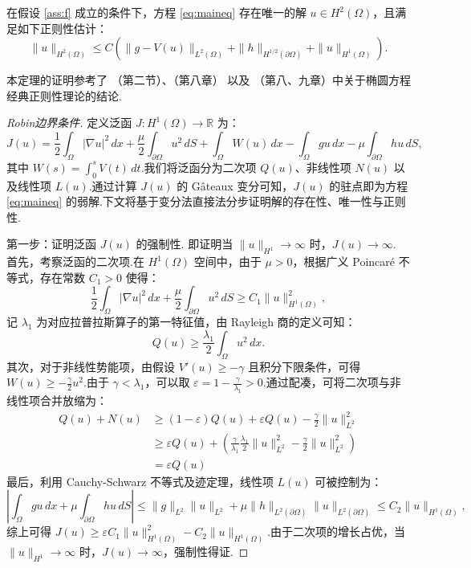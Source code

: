 \begin{theorem}[先验估计]\label{th:ch3reg}
在假设 \ref{ass:f} 成立的条件下，方程 \eqref{eq:maineq} 存在唯一的解 $u \in H^2(\Omega)$，且满足如下正则性估计：
$$\|u\|_{H^2(\Omega)} \le C \left( \|g - V(u)\|_{L^2(\Omega)} + \|h\|_{H^{1/2}(\partial \Omega)} + \|u\|_{H^1(\Omega)} \right).$$
\end{theorem}
本定理的证明参考了 \cite{roubicek2013nonlinear}（第二节）、\cite{evans2010partial}（第八章） 以及 \cite{brezis2011functional}（第八、九章）中关于椭圆方程经典正则性理论的结论.
\begin{proof}[Robin边界条件]
定义泛函 $J: H^1(\Omega) \to \mathbb{R}$ 为：
$$J(u) = \frac{1}{2}\int_{\Omega} |\nabla u|^2 \, dx + \frac{\mu}{2}\int_{\partial \Omega} u^2 \, dS + \int_{\Omega} W(u) \, dx - \int_{\Omega} gu \, dx - \mu \int_{\partial \Omega} hu \, dS,$$
其中 $W(s) = \int_0^s V(t) \, dt$.我们将泛函分为二次项 $Q(u)$、非线性项 $N(u)$ 以及线性项 $L(u)$.通过计算 $J(u)$ 的 Gâteaux 变分可知，$J(u)$ 的驻点即为方程 \eqref{eq:maineq} 的弱解.下文将基于变分法直接法分步证明解的存在性、唯一性与正则性.

第一步：证明泛函 $J(u)$ 的强制性.
即证明当 $\|u\|_{H^1} \to \infty$ 时，$J(u) \to \infty$.
首先，考察泛函的二次项.在 $H^1(\Omega)$ 空间中，由于 $\mu > 0$，根据广义 Poincaré 不等式，存在常数 $C_1 > 0$ 使得：
$$\frac{1}{2}\int_{\Omega} |\nabla u|^2 \, dx + \frac{\mu}{2}\int_{\partial \Omega} u^2 \, dS \ge C_1 \|u\|_{H^1(\Omega)}^2,$$
记 $\lambda_1$ 为对应拉普拉斯算子的第一特征值，由 Rayleigh 商的定义可知：
\begin{equation*}
Q(u) \ge \frac{\lambda_1}{2} \int_{\Omega} u^2 \, dx.
\end{equation*}
其次，对于非线性势能项，由假设 $V'(u) \ge -\gamma$ 且积分下限条件，可得 $W(u) \ge -\frac{\gamma}{2} u^2$.由于 $\gamma < \lambda_1$，可以取 $\varepsilon = 1 - \frac{\gamma}{\lambda_1} > 0$.通过配凑，可将二次项与非线性项合并放缩为：
\begin{equation*}
\begin{aligned}
Q(u) + N(u) &\ge (1-\varepsilon)Q(u) + \varepsilon Q(u) - \frac{\gamma}{2}\|u\|_{L^2}^2\\
&\ge \varepsilon Q(u) + \left( \frac{\gamma}{\lambda_1} \frac{\lambda_1}{2} \|u\|_{L^2}^2 - \frac{\gamma}{2} \|u\|_{L^2}^2 \right) \\
&= \varepsilon Q(u)
\end{aligned}
\end{equation*}
最后，利用 Cauchy-Schwarz 不等式及迹定理，线性项 $L(u)$ 可被控制为：
$$\left| \int_{\Omega} gu \, dx + \mu \int_{\partial \Omega} hu \, dS \right| \le \|g\|_{L^2}\|u\|_{L^2} + \mu \|h\|_{L^2(\partial\Omega)}\|u\|_{L^2(\partial\Omega)} \le C_2 \|u\|_{H^1(\Omega)},$$
综上可得 $J(u) \ge \varepsilon C_1 \|u\|_{H^1(\Omega)}^2 - C_2 \|u\|_{H^1(\Omega)}$.由于二次项的增长占优，当 $\|u\|_{H^1} \to \infty$ 时，$J(u) \to \infty$，强制性得证.


\end{proof}
